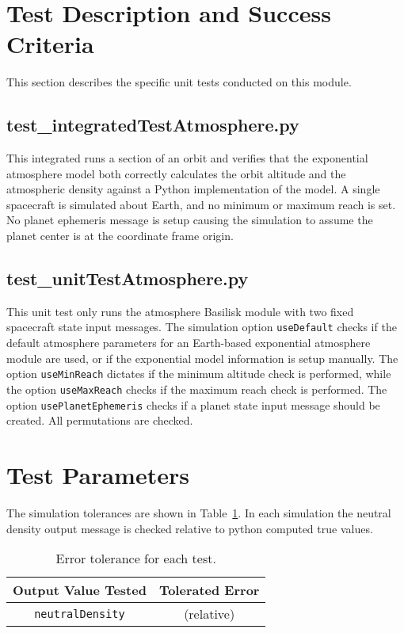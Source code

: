 
\section{Test Description and Success Criteria}
This section describes the specific unit tests conducted on this module.


\subsection{test\_integratedTestAtmosphere.py}
This integrated runs a section of an orbit and verifies that the exponential atmosphere model both correctly calculates the orbit altitude and the atmospheric density against a Python implementation of the model.   A single spacecraft is simulated about Earth, and no minimum or maximum reach is set.  No planet ephemeris message is setup causing the simulation to assume the planet center is at the coordinate frame origin.

\subsection{test\_unitTestAtmosphere.py}
This unit test only runs the atmosphere Basilisk module with two fixed spacecraft state input messages.  The simulation option {\tt useDefault} checks if the default atmosphere parameters for an Earth-based exponential atmosphere module are used, or if the exponential model information is setup manually.  The option {\tt useMinReach} dictates if the minimum altitude check is performed, while the option {\tt useMaxReach} checks if the maximum reach check is performed.  The option {\tt usePlanetEphemeris} checks if a planet state input message should be created.  All permutations are checked.

\section{Test Parameters}
The simulation tolerances are shown in Table~\ref{tab:errortol}.  In each simulation the neutral density output message is checked relative to python computed true values.  
\begin{table}[htbp]
	\caption{Error tolerance for each test.}
	\label{tab:errortol}
	\centering \fontsize{10}{10}\selectfont
	\begin{tabular}{ c | c } %
		\hline\hline
		\textbf{Output Value Tested}  & \textbf{Tolerated Error}  \\ 
		\hline
		{\tt neutralDensity}        &  (relative) \\
		\hline\hline
	\end{tabular}
\end{table}




